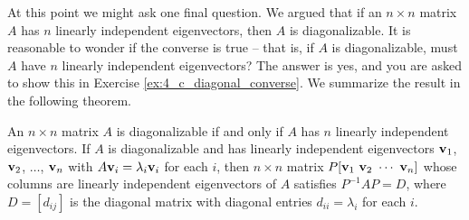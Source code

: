 At this point we might ask one final question. We argued that if an $n \times n$ matrix $A$ has $n$ linearly independent eigenvectors, then $A$ is diagonalizable. It is reasonable to wonder if the converse is true -- that is, if $A$ is diagonalizable, must $A$ have $n$ linearly independent eigenvectors? The answer is yes, and you are asked to show this in Exercise \ref{ex:4_c_diagonal_converse}. We summarize the result in the following theorem.

\begin{theorem} An $n \times n$ matrix $A$ is diagonalizable if and only if $A$ has $n$ linearly independent eigenvectors. If $A$ is diagonalizable and has linearly independent eigenvectors $\mathbf{v}_1$, $\mathbf{v}_2$, $\ldots$, $\mathbf{v}_n$ with $A\mathbf{v}_i = \lambda_i \mathbf{v}_i$ for each $i$, then $n \times n$ matrix $P [ \vv_1 \ \vv_2 \ \cdots \ \vv_n]$ whose columns are linearly independent eigenvectors of $A$ satisfies $P^{-1}AP = D$, where $D = [d_{ij}]$ is the diagonal matrix  with diagonal entries $d_{ii} = \lambda_i$ for each $i$.
\end{theorem}



\ExampleIntro

